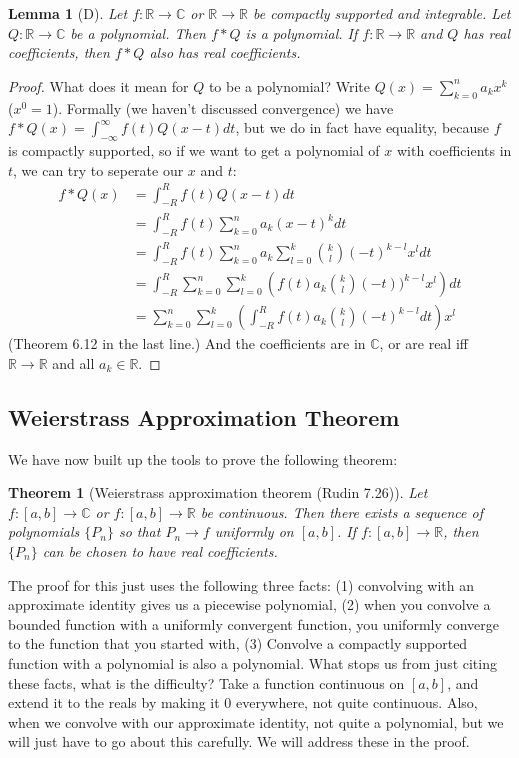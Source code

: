 \documentclass{article}
\theoremstyle{plain}
\newtheorem{theorem}{Theorem}
\newtheorem{lemma}{Lemma}
\theoremstyle{remark}
\newcommand{\R}{{\mathbb R}}
\newcommand{\C}{{\mathbb C}}
\begin{document}
\begin{lemma}[D]
	Let $f \colon \R \to \C$ or $\R \to \R$ be compactly supported and integrable.
	Let $Q \colon \R \to \C$ be a polynomial.
	Then $f * Q$ is a polynomial.
	If $f \colon \R \to \R$ and $Q$ has real coefficients,
	then $f * Q$ also has real coefficients.
\end{lemma}
\begin{proof}
	What does it mean for $Q$ to be a polynomial?
	Write $Q(x) = \sum_{k=0}^n a_k x^k$ ($x^0 = 1$).
	Formally (we haven't discussed convergence) we have
	$f * Q(x) = \int_{-\infty}^\infty f(t)Q(x-t)dt$,
	but we do in fact have equality, because $f$ is compactly supported, so
	if we want to get a polynomial of $x$ with coefficients in $t$,
	we can try to seperate our $x$ and $t$:
	\begin{align*}
		f * Q(x) &= \int_{-R}^R f(t) Q(x-t) dt\\
				 &= \int_{-R}^R f(t) \sum_{k=0}^n a_k (x-t)^kdt\\
				 &= \int_{-R}^R f(t) \sum_{k=0}^n a_k \sum_{l=0}^k \binom{k}{l}(-t)^{k-l}x^ldt\\
				 &= \int_{-R}^R \sum_{k=0}^n \sum_{l=0}^k
				 \left(f(t)a_k \binom{k}{l}(-t))^{k-l}x^l\right)dt\\
				 &= \sum_{k=0}^n \sum_{l=0}^k
				 \left(\int_{-R}^R f(t) a_k\binom{k}{l}(-t)^{k-l}dt\right)x^l
	\end{align*}
	(Theorem 6.12 in the last line.)
	And the coefficients are in $\C$, or are real iff $\R \to \R$ and all $a_k \in \R$.
\end{proof}

\subsection{Weierstrass Approximation Theorem}
We have now built up the tools to prove the following theorem:
\begin{theorem}[Weierstrass approximation theorem (Rudin 7.26)]
	Let $f \colon [a,b] \to \C$ or $f \colon [a,b] \to \R$ be continuous.
	Then there exists a sequence of polynomials $\{P_n\}$
	so that $P_n \to f$ uniformly on $[a,b]$.
	If $f \colon [a,b] \to \R$, then $\{P_n\}$ can be chosen to have real coefficients.
\end{theorem}

The proof for this just uses the following three facts:
(1) convolving with an approximate identity gives us a piecewise polynomial,
(2) when you convolve a bounded function with a uniformly convergent function,
you uniformly converge to the function that you started with,
(3) Convolve a compactly supported function with a polynomial is also a polynomial.
What stops us from just citing these facts, what is the difficulty?
Take a function continuous on $[a,b]$, and extend it to the reals
by making it $0$ everywhere, not quite continuous.
Also, when we convolve with our approximate identity,
not quite a polynomial, but we will just have to go about this carefully.
We will address these in the proof.
\end{document}
